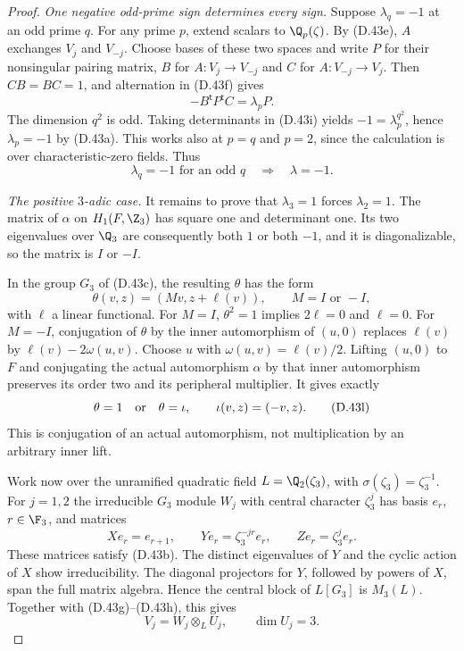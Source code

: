\begin{proof}
\emph{One negative odd-prime sign determines every sign.}
Suppose $\lambda_q=-1$ at an odd prime $q$.
For any prime $p$, extend scalars to $\Q_p(\zeta)$.
By (D.43e), $A$ exchanges $V_j$ and $V_{-j}$.
Choose bases of these two spaces and write $P$ for
their nonsingular pairing matrix, $B$ for
$A:V_j\to V_{-j}$ and $C$ for $A:V_{-j}\to V_j$.
Then $CB=BC=1$, and alternation in (D.43f) gives
\[
                  -B^{\mathsf t}P^{\mathsf t}C
                                      =\lambda_p P.
                                                        \tag{D.43i}
\]
The dimension $q^2$ is odd.  Taking determinants
in (D.43i) yields $-1=\lambda_p^{q^2}$, hence
$\lambda_p=-1$ by (D.43a).
This works also at $p=q$ and $p=2$, since the
calculation is over characteristic-zero fields.
Thus
\[
       \lambda_q=-1\text{ for an odd }q
                  \quad\Longrightarrow\quad\lambda=-1.
                                                        \tag{D.43j}
\]

\emph{The positive $3$-adic case.}
It remains to prove that $\lambda_3=1$ forces
$\lambda_2=1$.  The matrix of $\alpha$ on
$H_1(F,\Z_3)$ has square one and determinant one.
Its two eigenvalues over $\Q_3$ are consequently
both $1$ or both $-1$, and it is diagonalizable,
so the matrix is $I$ or $-I$.

In the group $G_3$ of (D.43c), the resulting $\theta$
has the form
\[
                \theta(v,z)=(Mv,z+\ell(v)),
                      \qquad M=I\text{ or }-I,
                                                        \tag{D.43k}
\]
with $\ell$ a linear functional.
For $M=I$, $\theta^2=1$ implies $2\ell=0$ and
$\ell=0$.
For $M=-I$, conjugation of $\theta$ by the inner
automorphism of $(u,0)$ replaces $\ell(v)$ by
$\ell(v)-2\omega(u,v)$.  Choose $u$ with
$\omega(u,v)=\ell(v)/2$.  Lifting $(u,0)$ to $F$
and conjugating the actual automorphism $\alpha$
by that inner automorphism preserves its order two
and its peripheral multiplier.  It gives exactly
\[
             \theta=1\quad\hbox{or}\quad
             \theta=\iota,\qquad\iota(v,z)=(-v,z).
                                                        \tag{D.43l}
\]
This is conjugation of an actual automorphism,
not multiplication by an arbitrary inner lift.

Work now over the unramified quadratic field
$L=\Q_2(\zeta_3)$, with
$\sigma(\zeta_3)=\zeta_3^{-1}$.
For $j=1,2$ the irreducible $G_3$ module $W_j$
with central character $\zeta_3^j$ has basis
$e_r$, $r\in\F_3$, and matrices
\[
 X e_r=e_{r+1},\qquad
 Y e_r=\zeta_3^{-jr}e_r,\qquad
 Z e_r=\zeta_3^j e_r .
                                                        \tag{D.43m}
\]
These matrices satisfy (D.43b).
The distinct eigenvalues of $Y$ and the cyclic
action of $X$ show irreducibility.  The diagonal
projectors for $Y$, followed by powers of $X$,
span the full matrix algebra.  Hence the central
block of $L[G_3]$ is $M_3(L)$.
Together with (D.43g)--(D.43h), this gives
\[
                       V_j=W_j\otimes_L U_j,
                             \qquad\dim U_j=3.
                                                        \tag{D.43n}
\]


\end{proof}
